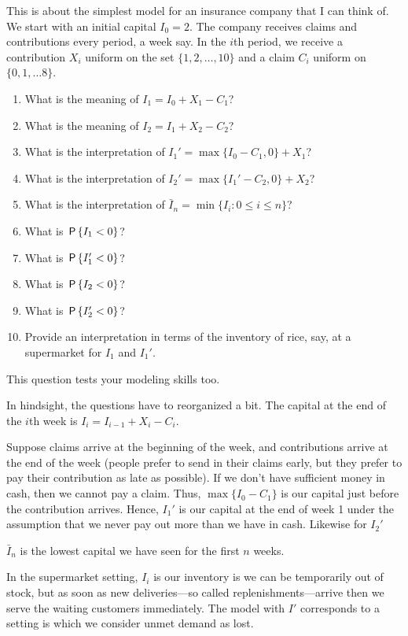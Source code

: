 \begin{exercise}
This is about the simplest model for an insurance company that I can think of.
We start with an initial capital $I_0=2$.
The company receives claims and contributions every period, a week say.
In the $i$th period, we receive a contribution $X_{i}$ uniform on the set $\{1, 2,\ldots,10\}$ and a claim $C_i$ uniform on $\{0, 1, \ldots 8\}$.
\begin{enumerate}
\item What is the meaning of $I_1=I_0+X_1-C_1$?
\item What is the meaning of $I_2=I_1+X_2-C_2$?
\item What is the interpretation of $I_1'=\max\{I_0-C_1,0\} + X_1$?
\item What is the interpretation of $I_2'=\max\{I_1'-C_2,0\} + X_2$?
\item What is the interpretation of $\bar I_{n} = \min\{I_{i} : 0\leq i\leq n\}$?
\item What is  $\P{I_1 < 0}$?
\item What is  $\P{I_1' < 0}$?
\item What is  $\P{I_2 < 0}$?
\item What is  $\P{I_2' < 0}$?
\item Provide an interpretation in terms of the inventory of rice, say, at a supermarket for $I_{1}$ and $I_{1}'$.
\end{enumerate}
\begin{solution}
This question tests your modeling skills too.

In hindsight, the questions have to reorganized a bit.
The capital at the end of the $i$th week is $I_{i} = I_{i-1} + X_{i} - C_{i}$.

Suppose claims arrive at the beginning of the week, and contributions arrive at the end of the week (people prefer to send in their claims early, but they prefer to pay their contribution as late as possible).
If we don't have sufficient money in cash, then we cannot pay a claim.
Thus, $\max\{I_{0}-C_{1}\}$ is our capital just before the contribution arrives. Hence, $I_{1}'$ is our capital at the end of week 1 under the assumption that we never pay out more than we have in cash. Likewise for $I_{2}'$

$\bar I_{n}$ is the lowest capital we have seen for the first $n$ weeks.

In the supermarket setting, $I_{i}$ is our inventory is we can be temporarily out of stock, but as soon as new deliveries---so called replenishments---arrive then we serve the waiting customers immediately.
The model with $I'$ corresponds to a setting is which we consider unmet demand as lost.


\end{solution}
\end{exercise}
